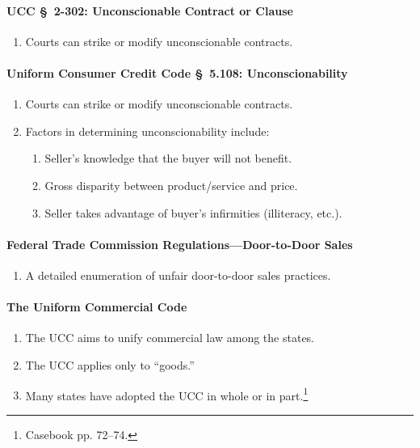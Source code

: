 \paragraph{UCC \S\ 2-302: Unconscionable Contract or Clause}

\begin{enumerate}
    \item Courts can strike or modify unconscionable contracts.
\end{enumerate}

\paragraph{Uniform Consumer Credit Code \S\ 5.108: Unconscionability}

\begin{enumerate}
    \item Courts can strike or modify unconscionable contracts.
    \item Factors in determining unconscionability include:
    \begin{enumerate}
        \item Seller's knowledge that the buyer will not benefit.
        \item Gross disparity between product/service and price.
        \item Seller takes advantage of buyer's infirmities (illiteracy, 
        etc.).
    \end{enumerate}
\end{enumerate}

\paragraph{Federal Trade Commission Regulations---Door-to-Door Sales}

\begin{enumerate}
    \item A detailed enumeration of unfair door-to-door sales practices.
\end{enumerate}

\paragraph{The Uniform Commercial Code}

\begin{enumerate}
    \item The UCC aims to unify commercial law among the states.
    \item The UCC applies only to ``goods.''
    \item Many states have adopted the UCC in whole or in 
    part.\footnote{Casebook pp. 72--74.}
\end{enumerate}

